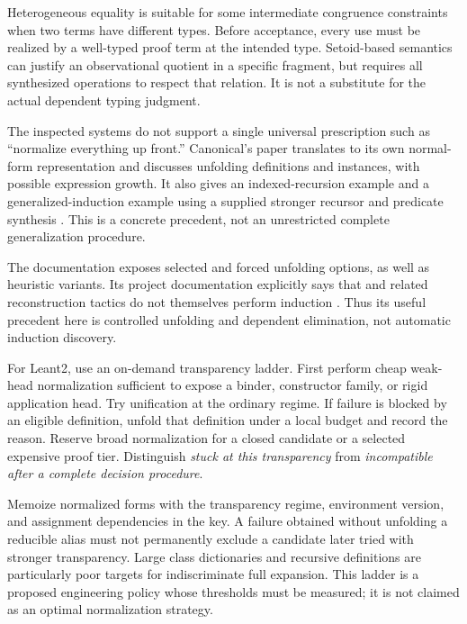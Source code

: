 Heterogeneous equality is suitable for some intermediate congruence constraints when two terms have different types. Before acceptance, every use must be realized by a well-typed proof term at the intended type. Setoid-based semantics can justify an observational quotient in a specific fragment, but requires all synthesized operations to respect that relation. It is not a substitute for the actual dependent typing judgment.

\ans The inspected systems do not support a single universal prescription such as ``normalize everything up front.'' Canonical's paper translates to its own normal-form representation and discusses unfolding definitions and instances, with possible expression growth. It also gives an indexed-recursion example and a generalized-induction example using a supplied stronger recursor and predicate synthesis \cite{canonical}. This is a concrete precedent, not an unrestricted complete generalization procedure.

The  documentation exposes selected and forced unfolding options, as well as heuristic variants. Its project documentation explicitly says that  and related reconstruction tactics do not themselves perform induction \cite{sauto,sautodocs}. Thus its useful precedent here is controlled unfolding and dependent elimination, not automatic induction discovery.

For Leant2, use an on-demand transparency ladder. First perform cheap weak-head normalization sufficient to expose a binder, constructor family, or rigid application head. Try unification at the ordinary regime. If failure is blocked by an eligible definition, unfold that definition under a local budget and record the reason. Reserve broad normalization for a closed candidate or a selected expensive proof tier. Distinguish \emph{stuck at this transparency} from \emph{incompatible after a complete decision procedure}.

Memoize normalized forms with the transparency regime, environment version, and assignment dependencies in the key. A failure obtained without unfolding a reducible alias must not permanently exclude a candidate later tried with stronger transparency. Large class dictionaries and recursive definitions are particularly poor targets for indiscriminate full expansion. This ladder is a proposed engineering policy whose thresholds must be measured; it is not claimed as an optimal normalization strategy.

